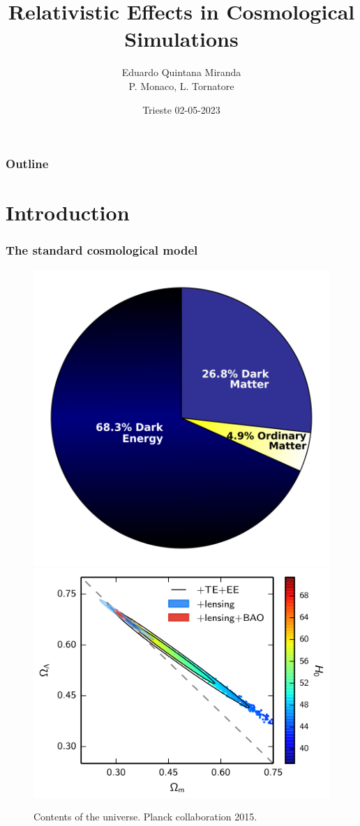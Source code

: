 \documentclass{beamer}
\title{Relativistic Effects in Cosmological Simulations}
\author{Eduardo Quintana Miranda\\P. Monaco, L. Tornatore}
\date{Trieste 02-05-2023}
\makeatletter
\newcommand{\mylabel}{%
}
\makeatother
\begin{document}
\begin{frame}[label=title]
    \titlepage
\end{frame}

\begin{frame}[label=toc]
    \frametitle{Outline\mylabel}
    \tableofcontents
\end{frame}

\section{Introduction}
\frame{\sectionpage}

\begin{frame}[label=cosmologyLCDM]
    \frametitle{The standard cosmological model\mylabel}
    \begin{figure}
        \includegraphics[width=.39\textwidth]{images/dark-sector.png}
        \includegraphics[width=.59\textwidth]{images/planck2015.png}
	\caption{Contents of the universe.
	Planck collaboration 2015.}
    \end{figure}
\end{frame}
\end{document}
